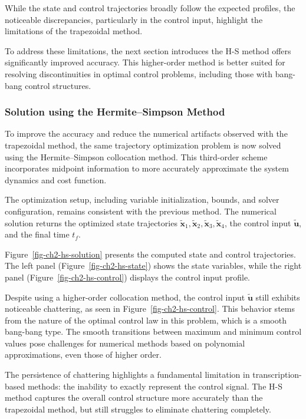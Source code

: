 \documentclass[
  number,
  preprint]{elsarticle}
\begin{document}
While the state and control trajectories broadly follow the expected
profiles, the noticeable discrepancies, particularly in the control
input, highlight the limitations of the trapezoidal method.

To address these limitations, the next section introduces the H-S method
offers significantly improved accuracy. This higher-order method is
better suited for resolving discontinuities in optimal control problems,
including those with bang-bang control structures.

\subsubsection{Solution using the Hermite--Simpson
Method}\label{solution-using-the-hermitesimpson-method}

To improve the accuracy and reduce the numerical artifacts observed with
the trapezoidal method, the same trajectory optimization problem is now
solved using the Hermite--Simpson collocation method. This third-order
scheme incorporates midpoint information to more accurately approximate
the system dynamics and cost function.

The optimization setup, including variable initialization, bounds, and
solver configuration, remains consistent with the previous method. The
numerical solution returns the optimized state trajectories
\(\tilde{\mathbf{x}}_1, \tilde{\mathbf{x}}_2, \tilde{\mathbf{x}}_3, \tilde{\mathbf{x}}_4\),
the control input \(\tilde{\mathbf{u}}\), and the final time \(t_f\).

Figure~\ref{fig-ch2-hs-solution} presents the computed state and control
trajectories. The left panel (Figure~\ref{fig-ch2-hs-state}) shows the
state variables, while the right panel (Figure~\ref{fig-ch2-hs-control})
displays the control input profile.

Despite using a higher-order collocation method, the control input
\(\tilde{\mathbf{u}}\) still exhibits noticeable chattering, as seen in
Figure~\ref{fig-ch2-hs-control}. This behavior stems from the nature of
the optimal control law in this problem, which is a smooth bang-bang
type. The smooth transitions between maximum and minimum control values
pose challenges for numerical methods based on polynomial
approximations, even those of higher order.

The persistence of chattering highlights a fundamental limitation in
transcription-based methods: the inability to exactly represent the
control signal. The H-S method captures the overall control structure
more accurately than the trapezoidal method, but still struggles to
eliminate chattering completely.
\end{document}
